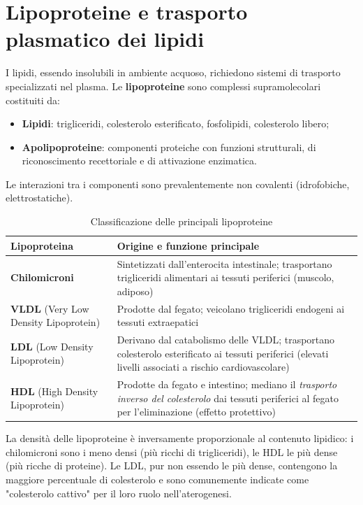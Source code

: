\documentclass[12pt,a4paper]{report}
\begin{document}
\section{Lipoproteine e trasporto plasmatico dei lipidi}
I lipidi, essendo insolubili in ambiente acquoso, richiedono sistemi di trasporto specializzati nel plasma. Le \textbf{lipoproteine} sono complessi supramolecolari costituiti da:
\begin{itemize}
\item \textbf{Lipidi}: trigliceridi, colesterolo esterificato, fosfolipidi, colesterolo libero;
\item \textbf{Apolipoproteine}: componenti proteiche con funzioni strutturali, di riconoscimento recettoriale e di attivazione enzimatica.
\end{itemize}
Le interazioni tra i componenti sono prevalentemente non covalenti (idrofobiche, elettrostatiche).
\begin{table}[htbp]
\centering
\caption{Classificazione delle principali lipoproteine}
\label{tab:lipoproteine}
\renewcommand{\arraystretch}{1.2}
\begin{tabular}{@{} p{} p{} @{}}
\toprule
\textbf{Lipoproteina} & \textbf{Origine e funzione principale} \\
\midrule
\textbf{Chilomicroni} & Sintetizzati dall'enterocita intestinale; trasportano trigliceridi alimentari ai tessuti periferici (muscolo, adiposo) \\
\textbf{VLDL} (Very Low Density Lipoprotein) & Prodotte dal fegato; veicolano trigliceridi endogeni ai tessuti extraepatici \\
\textbf{LDL} (Low Density Lipoprotein) & Derivano dal catabolismo delle VLDL; trasportano colesterolo esterificato ai tessuti periferici (elevati livelli associati a rischio cardiovascolare) \\
\textbf{HDL} (High Density Lipoprotein) & Prodotte da fegato e intestino; mediano il \textit{trasporto inverso del colesterolo} dai tessuti periferici al fegato per l'eliminazione (effetto protettivo) \\
\bottomrule
\end{tabular}
\end{table}
La densità delle lipoproteine è inversamente proporzionale al contenuto lipidico: i chilomicroni sono i meno densi (più ricchi di trigliceridi), le HDL le più dense (più ricche di proteine). Le LDL, pur non essendo le più dense, contengono la maggiore percentuale di colesterolo e sono comunemente indicate come "colesterolo cattivo" per il loro ruolo nell'aterogenesi.
\end{document}
